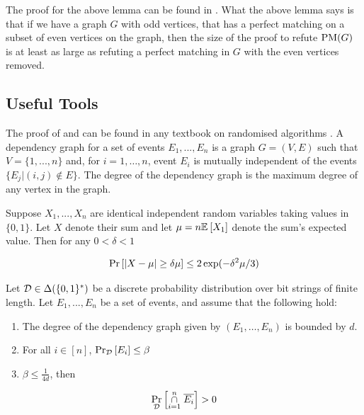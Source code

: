 \documentclass[11pt]{article}
\begin{document}
The proof for the above lemma can be found in \citep[Lemma 2.2]{Austrin_2022}.
What the above lemma says is that if we have a graph $G$ with odd vertices, that has a perfect matching on a subset of even vertices on the graph, then the size of the proof to refute $\text{PM}(G)$ is at least as large as refuting a perfect matching in $G$ with the even vertices removed.

\subsection{Useful Tools}

The proof of  and 
can be found in any textbook on randomised algorithms \citep[See Chapter 1, Chapter 7]{mitzenmacher2017probability}.
A dependency graph for a set of events $E_1, . . . , E_n$ is a graph $G=(V, E)$ such that $V = \{1,.. . , n\}$ and,  for $i= 1,\dots, n$, event $E_i$ is mutually independent
of the events $\{E_j | (i, j) \notin E\}$. The degree of the dependency graph is the maximum degree of any vertex in the graph.


\begin{lemma}\label{lemma:mult-chernoff}
Suppose $X_1, ..., X_n$ are identical independent random variables taking values in $\{0, 1\}$. Let $X$ denote their sum and let $\mu = n\mathbb{E}_{}\left[X_1\right]$ denote the sum's expected value. Then for any $0 < \delta < 1$

\[ \Pr\left[|X - \mu| \geq \delta \mu \right] \leq 2\exp(-\delta^2\mu/3)\]
	
\end{lemma}




\begin{lemma}\label{lemma:lll}Let $\mathcal{D} \in \Delta(\{0,1\}^*)$ be a discrete probability distribution over bit strings of finite length.
  Let $E_1,...,E_n$ be a set of events, and assume that the following hold:
\begin{enumerate}
\item The degree of the dependency graph given by $(E_1, \dots, E_n)$ is bounded by $d$.

\item For all $i \in [n]$, $\Pr_{\mathcal{D}}\left[E_i \right] \leq \beta$

\item $\beta \leq \frac{1}{4d}$, then 
  
\end{enumerate}

\[ \Pr_{\mathcal{D}}\left[\overset{n}{ \underset{i=1}{\cap}} \hspace{0.1cm}  \overline{E_i} \right] > 0\]		


\end{lemma}
\end{document}
